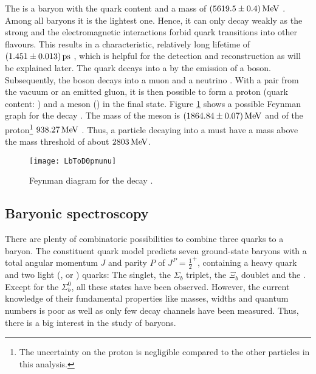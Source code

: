 The \Lb is a baryon with the quark content \uquark\dquark\bquark and a mass of $(5619.5 \pm 0.4)\mathrm{\,Me\kern -0.1em V}$ \cite{PDG}.
Among all \bquark baryons it is the lightest one.
Hence, it can only decay weakly as the strong and the electromagnetic interactions forbid quark transitions into other flavours.
This results in a characteristic, relatively long lifetime of $(1.451 \pm 0.013){\rm \,ps}$ \cite{PDG}, which is helpful for the detection and reconstruction as will be explained later.
The \bquark quark decays into a \cquark by the emission of a \Wm boson.
Subsequently, the \Wm boson decays into a muon \mun and a neutrino \neumb.
With a \uubar pair from the vacuum or an emitted gluon, it is then possible to form a proton \proton (quark content: \uquark\uquark\dquark) and a \Dz meson (\cquark\uquarkbar) in the final state.
Figure \ref{fig:LbToDpmunu} shows a possible Feynman graph for the decay \LbToDpmunu.
The mass of the \Dz meson is $(1864.84 \pm 0.07)\mathrm{\,Me\kern -0.1em V}$ and of the proton\footnote{The uncertainty on the proton is negligible compared to the other particles in this analysis.} $938.27\mathrm{\,Me\kern -0.1em V}$ \cite{PDG}.
Thus, a particle decaying into a \Dz\proton must have a mass above the \Dz\proton mass threshold of about $2803\mathrm{\,Me\kern -0.1em V}$.
\begin{figure}[tb]
    \centering
	\texttt{[image: LbToD0pmunu]}	
	\caption{Feynman diagram for the decay \LbToDpmunu.}
	\label{fig:LbToDpmunu}
\end{figure}

\subsection{Baryonic spectroscopy}
There are plenty of combinatoric possibilities to combine three quarks to a baryon.
The constituent quark model predicts seven ground-state baryons with a total angular momentum $J$ and parity $P$ of $J^P = \frac{1}{2}^+$, containing a heavy \bquark quark and two light (\uquark, \dquark or \squark) quarks: 
The \Lb singlet, the $\Sigma_b$ triplet, the $\Xi_b$ doublet and the \Omegab \cite{LHCb_Dph}.
Except for the $\Sigma_b^0$, all these states have been observed.
However, the current knowledge of their fundamental properties like masses, widths and quantum numbers is poor as well as only few decay channels have been measured.
Thus, there is a big interest in the study of \bquark baryons.

